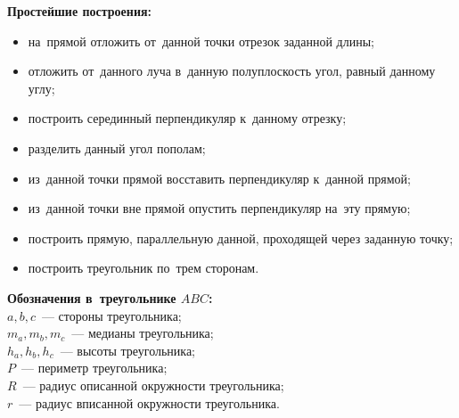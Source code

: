 


\textbf{Простейшие построения:}
\begin{itemize}

\item
на~прямой отложить от~данной точки отрезок заданной длины;

\item
отложить от~данного луча в~данную полуплоскость угол, равный данному углу;

\item
построить серединный перпендикуляр к~данному отрезку;

\item
разделить данный угол пополам;

\item
из~данной точки прямой восставить перпендикуляр к~данной прямой;

\item
из~данной точки вне прямой опустить перпендикуляр на~эту прямую;

\item
построить прямую, параллельную данной, проходящей через заданную точку;

\item
построить треугольник по~трем сторонам.

\end{itemize}


\textbf{Обозначения в~треугольнике $ABC$:}
\\
$a, b, c$~--- стороны треугольника;
\\
$m_{a}, m_{b}, m_{c}$~--- медианы треугольника;
\\
$h_{a}, h_{b}, h_{c}$~--- высоты треугольника;
\\
$P$~--- периметр треугольника;
\\
$R$~--- радиус описанной окружности треугольника;
\\
$r$~--- радиус вписанной окружности треугольника.


